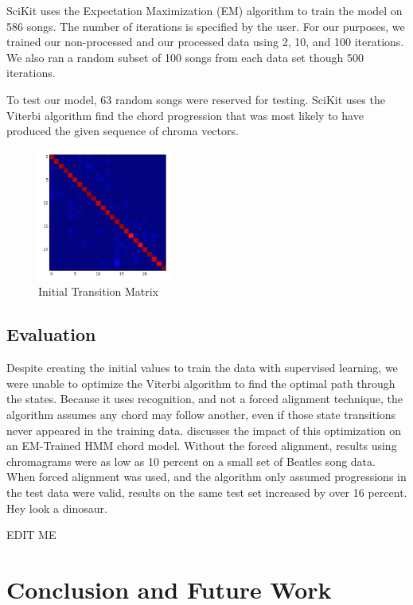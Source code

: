 \documentclass{article}
\begin{document}
SciKit uses the Expectation Maximization (EM) algorithm to train the model on
586 songs. The number of iterations is specified by the user. For our purposes,
we trained our non-processed and our processed data using 2, 10, and 100
iterations. We also ran a random subset of 100 songs from each data set though
500 iterations.

To test our model, 63 random songs were reserved for testing. SciKit uses the
Viterbi algorithm find the chord progression that was most likely to have
produced the given sequence of chroma vectors.


\begin{figure}
   \centering
   \includegraphics[width=0.4\textwidth]{trans-h.png}
   \caption{Initial Transition Matrix}
   \label{fig:transmath}
\end{figure}

\subsection{Evaluation}

Despite creating the initial values to train the data with supervised learning,
we were unable to optimize the Viterbi algorithm to find the optimal path
through the states. Because it uses recognition, and not a forced alignment
technique, the algorithm assumes any chord may follow another, even if those
state transitions never appeared in the training data. \cite{Danellis:23}
discusses the impact of this optimization on an EM-Trained HMM chord model.
Without the forced alignment, results using chromagrams were as low as 10
percent on a small set of Beatles song data. When forced alignment was used,
and the algorithm only assumed progressions in the test data were valid,
results on the same test set increased by over 16 percent.  Hey look a
dinosaur.


EDIT ME

\section{Conclusion and Future Work}
\end{document}
